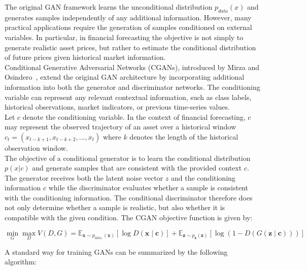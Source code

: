 The original GAN framework learns the unconditional distribution
$p_{data}(x)$ and generates samples independently of any additional
information. However, many practical applications require the generation of
samples conditioned on external variables. In particular, in financial
forecasting the objective is not simply to generate realistic asset prices,
but rather to estimate the conditional distribution of future prices given
historical market information.\\
Conditional Generative Adversarial Networks (CGANs), introduced by Mirza and
Osindero~\cite{background:cgan}, extend the original GAN architecture by incorporating
additional information into both the generator and discriminator networks.
The conditioning variable can represent any relevant contextual information,
such as class labels, historical observations, market indicators, or previous
time-series values.\\
Let $c$ denote the conditioning variable. In the context of financial
forecasting, $c$ may represent the observed trajectory of an asset over a
historical window $c_t=(x_{t-k+1},x_{t-k+2},...,x_t)$ where $k$ denotes the length of the historical observation window.\\
The objective of a conditional generator is to learn the conditional
distribution $p(x|c)$ and generate samples that are consistent with the provided context $c$.\\

The generator receives both the latent noise vector $z$ and the conditioning
information $c$ while the discriminator evaluates whether a sample is consistent with the
conditioning information.
The conditional discriminator therefore does not only determine whether a
sample is realistic, but also whether it is compatible with the given
condition.
The CGAN objective function is given by:


\begin{equation}
    \label{eq:CGAN minimax}
    \min _G \max _D V(D, G)=\mathbb{E}_{\boldsymbol{x} \sim p_{\text {data }}(\boldsymbol{x})}[\log D(\boldsymbol{x} \mid \boldsymbol{c})]+\mathbb{E}_{\boldsymbol{z} \sim p_{\boldsymbol{z}}(\boldsymbol{z})}[\log (1-D(G(\boldsymbol{z} \mid \boldsymbol{c})))]
\end{equation}

A standard way for training GANs can be summarized by the following algorithm:

